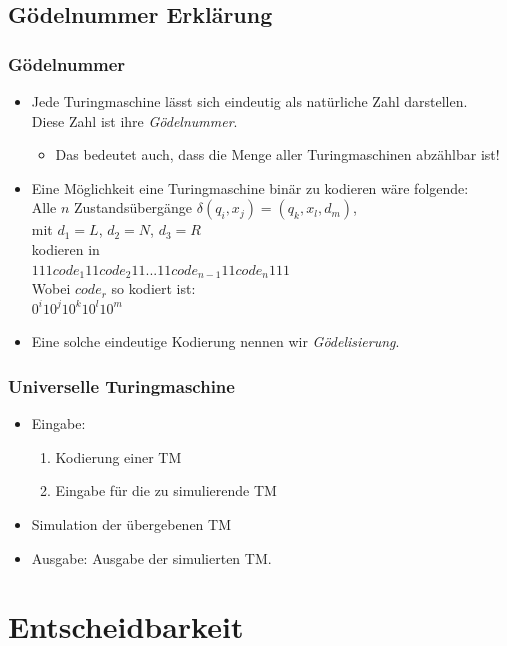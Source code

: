 \subsection{Gödelnummer Erklärung}
\begin{frame}
	\frametitle{Gödelnummer}
	\begin{itemize}
		\item Jede Turingmaschine lässt sich eindeutig als natürliche Zahl darstellen. \\ Diese Zahl ist ihre \emph{Gödelnummer}.
		\begin{itemize}
			\item Das bedeutet auch, dass die Menge aller Turingmaschinen abzählbar ist!
		\end{itemize}
		\item Eine Möglichkeit eine Turingmaschine binär zu kodieren wäre folgende: \\
		Alle $n$ Zustandsübergänge $\delta(q_i, x_j) = (q_k, x_l, d_m)$, \\
		mit $d_1 = L$, $d_2 = N$, $d_3 = R$ \\
		kodieren in \\
		$111 code_1 11 code_2 11 ... 11 code_{n-1} 11 code_n 111$ \\
		Wobei $code_r$ so kodiert ist: \\
		$0^i 1 0^j 1 0^k 1 0^l 1 0^m$
		\item Eine solche eindeutige Kodierung nennen wir \emph{Gödelisierung}.
	\end{itemize}
\end{frame}

\begin{frame}
	\frametitle{Universelle Turingmaschine}
\begin{itemize}
	\item Eingabe:
	\begin{enumerate}
	\item Kodierung einer TM
	\item Eingabe für die zu simulierende TM
	\end{enumerate}
	\item Simulation der übergebenen TM
	\item Ausgabe: Ausgabe der simulierten TM.
	\end{itemize}
\end{frame}

\section{Entscheidbarkeit}
